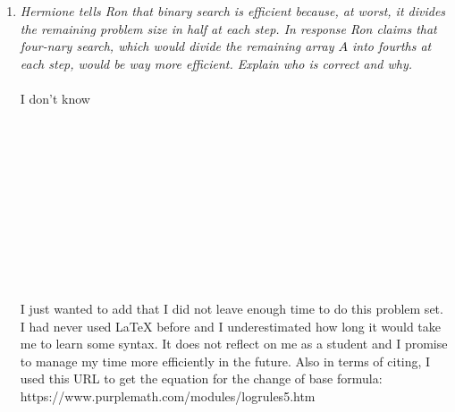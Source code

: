 \documentclass[12pt]{article}
\begin{document}
\begin{enumerate}
\begin{enumerate}
	
	\item \label{4b} {\itshape Hermione tells Ron that binary search is efficient because, at worst, it divides the remaining problem size in half at each step. In response Ron claims that four-nary search, which would divide the remaining array $A$ into fourths at each step, would be \textit{way more} efficient. Explain who is correct and why.}
\\ \\ I don't know \\ \\ \\ \\ \\ \\ \\ \\ \\ \\ \\ \\I just wanted to add that I did not leave enough time to do this problem set. I had never used LaTeX before and I underestimated how long it would take me to learn some syntax. It does not reflect on me as a student and I promise to manage my time more efficiently in the future. Also in terms of citing, I used this URL to get the equation for the change of base formula: \\https://www.purplemath.com/modules/logrules5.htm
	\pagebreak
	\end{enumerate}

	
\end{enumerate}
\end{document}

